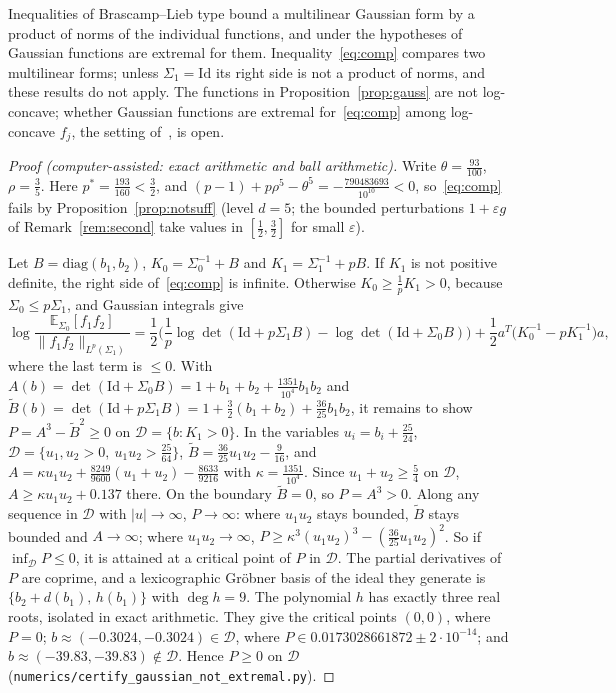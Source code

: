\documentclass[11pt]{amsart}
\theoremstyle{definition}
\newcommand{\E}{\mathbb{E}}
\newcommand{\Id}{\mathrm{Id}}
\begin{document}
Inequalities of Brascamp--Lieb type bound a multilinear Gaussian form by a product of norms of the individual
functions, and under the hypotheses of~\cite{Lieb90,BW22,CL21,NT25} Gaussian functions are extremal for them.
Inequality~\eqref{eq:comp} compares two multilinear forms; unless $\Sigma_1=\Id$ its right side is not a product of
norms, and these results do not apply. The functions in Proposition~\ref{prop:gauss} are not log-concave; whether
Gaussian functions are extremal for~\eqref{eq:comp} among log-concave $f_j$, the setting of~\cite{MNT26}, is open.

\begin{proof}[Proof (computer-assisted: exact arithmetic and ball arithmetic)]
Write $\theta=\frac{93}{100}$, $\rho=\frac35$. Here $p^*=\frac{193}{160}<\frac32$, and
$(p-1)+p\rho^5-\theta^5=-\frac{790483693}{10^{10}}<0$, so~\eqref{eq:comp} fails by Proposition~\ref{prop:notsuff} (level
$d=5$; the bounded perturbations $1+\varepsilon g$ of Remark~\ref{rem:second} take values in $[\frac12,\frac32]$ for
small $\varepsilon$).

Let $B=\mathrm{diag}(b_1,b_2)$, $K_0=\Sigma_0^{-1}+B$ and $K_1=\Sigma_1^{-1}+pB$. If $K_1$ is not positive definite,
the right side of~\eqref{eq:comp} is infinite. Otherwise $K_0\ge\frac1pK_1>0$, because $\Sigma_0\le p\Sigma_1$, and
Gaussian integrals give
\[
\log\frac{\E_{\Sigma_0}[f_1f_2]}{\|f_1f_2\|_{L^p(\Sigma_1)}}=\frac12\Big(\frac1p\log\det(\Id+p\Sigma_1B)
-\log\det(\Id+\Sigma_0B)\Big)+\frac12a^T\big(K_0^{-1}-pK_1^{-1}\big)a ,
\]
where the last term is $\le0$. With $A(b)=\det(\Id+\Sigma_0B)=1+b_1+b_2+\frac{1351}{10^4}b_1b_2$ and
$\tilde B(b)=\det(\Id+p\Sigma_1B)=1+\frac32(b_1+b_2)+\frac{36}{25}b_1b_2$, it remains to show
$P=A^3-\tilde B^2\ge0$ on $\mathcal D=\{b:K_1>0\}$. In the variables $u_i=b_i+\frac{25}{24}$,
$\mathcal D=\{u_1,u_2>0,\ u_1u_2>\frac{25}{64}\}$, $\tilde B=\frac{36}{25}u_1u_2-\frac9{16}$, and
$A=\kappa u_1u_2+\frac{8249}{9600}(u_1+u_2)-\frac{8633}{9216}$ with $\kappa=\frac{1351}{10^4}$. Since
$u_1+u_2\ge\frac54$ on $\mathcal D$, $A\ge\kappa u_1u_2+0.137$ there. On the boundary $\tilde B=0$, so $P=A^3>0$.
Along any sequence in $\mathcal D$ with $|u|\to\infty$, $P\to\infty$: where $u_1u_2$ stays bounded, $\tilde B$ stays bounded
and $A\to\infty$; where $u_1u_2\to\infty$, $P\ge\kappa^3(u_1u_2)^3-(\frac{36}{25}u_1u_2)^2$. So if $\inf_{\mathcal D}P\le0$,
it is attained at a critical point of $P$ in $\mathcal D$. The partial derivatives of $P$ are coprime, and a
lexicographic Gr\"obner basis of the ideal they generate is $\{b_2+d(b_1),\,h(b_1)\}$ with $\deg h=9$. The
polynomial $h$ has exactly three real roots, isolated in exact arithmetic. They give the critical points $(0,0)$,
where $P=0$; $b\approx(-0.3024,-0.3024)\in\mathcal D$, where $P\in0.0173028661872\pm2\cdot10^{-14}$; and
$b\approx(-39.83,-39.83)\notin\mathcal D$. Hence $P\ge0$ on $\mathcal D$
(\texttt{numerics/certify\_gaussian\_not\_extremal.py}).
\end{proof}
\end{document}
